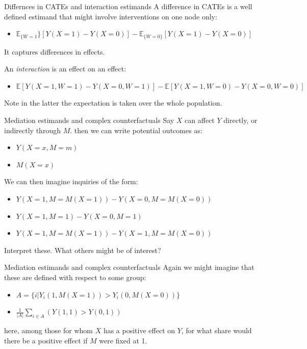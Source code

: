 \documentclass[
  11pt,
  ignorenonframetext,
]{beamer}
\providecommand{\tightlist}{%
  \setlength{\itemsep}{0pt}\setlength{\parskip}{0pt}}\usepackage{longtable,booktabs,array}
\begin{document}
\begin{frame}{Differnces in CATEs and interaction estimands}
\protect\hypertarget{differnces-in-cates-and-interaction-estimands}{}
A difference in CATEs is a well defined estimand that might involve
interventions on one node only:

\begin{itemize}
\tightlist
\item
  \(\mathbb{E}_{\{W=1}\}[Y(X=1) - Y(X=0)] - \mathbb{E}_{\{W=0\}}[Y(X=1) - Y(X=0)]\)
\end{itemize}

It captures differences in effects.

An \emph{interaction} is an effect on an effect:

\begin{itemize}
\tightlist
\item
  \(\mathbb{E}[Y(X=1, W=1) - Y(X=0, W=1)] - \mathbb{E}[Y(X=1, W=0) - Y(X=0, W=0)]\)
\end{itemize}

Note in the latter the expectation is taken over the whole population.
\end{frame}

\begin{frame}{Mediation estimands and complex counterfactuals}
\protect\hypertarget{mediation-estimands-and-complex-counterfactuals}{}
Say \(X\) can affect \(Y\) directly, or indirectly through \(M\). then
we can write potential outcomes as:

\begin{itemize}
\tightlist
\item
  \(Y(X=x, M=m)\)
\item
  \(M(X=x)\)
\end{itemize}

We can then imagine inquiries of the form:

\begin{itemize}
\tightlist
\item
  \(Y(X=1, M=M(X=1)) - Y(X=0, M=M(X=0))\)
\item
  \(Y(X=1, M=1) - Y(X=0, M=1)\)
\item
  \(Y(X=1, M=M(X=1)) - Y(X=1, M=M(X=0))\)
\end{itemize}

Interpret these. What others might be of interest?
\end{frame}

\begin{frame}{Mediation estimands and complex counterfactuals}
\protect\hypertarget{mediation-estimands-and-complex-counterfactuals-1}{}
Again we might imagine that these are defined with respect to some
group:

\begin{itemize}
\tightlist
\item
  \(A = \{i|Y_i(1, M(X=1)) > Y_i(0, M(X=0))\}\)
\item
  \(\frac{1}{|A|} \sum_{i\in A}(Y(1, 1) > Y(0, 1))\)
\end{itemize}

here, among those for whom \(X\) has a positive effect on \(Y\), for
what share would there be a positive effect if \(M\) were fixed at 1.
\end{frame}
\end{document}
